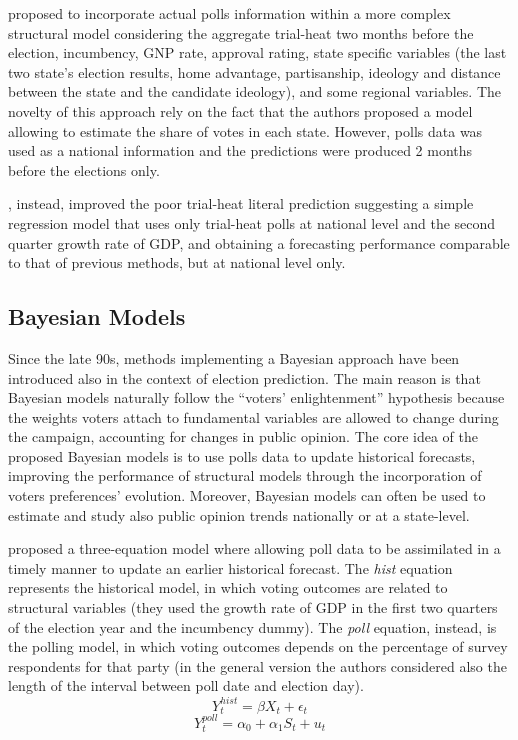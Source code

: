 \documentclass[
  12pt]{article}
\begin{document}
\citet{gel:kin:1993} proposed to incorporate actual polls information
within a more complex structural model considering the aggregate
trial-heat two months before the election, incumbency, GNP rate,
approval rating, state specific variables (the last two state's election
results, home advantage, partisanship, ideology and distance between the
state and the candidate ideology), and some regional variables. The
novelty of this approach rely on the fact that the authors proposed a
model allowing to estimate the share of votes in each state. However,
polls data was used as a national information and the predictions were
produced 2 months before the elections only.

\citet{cam:1996}, instead, improved the poor trial-heat literal
prediction suggesting a simple regression model that uses only
trial-heat polls at national level and the second quarter growth rate of
GDP, and obtaining a forecasting performance comparable to that of
previous methods, but at national level only.

\hypertarget{bayesian-models}{%
\subsection{Bayesian Models}\label{bayesian-models}}

Since the late 90s, methods implementing a Bayesian approach have been
introduced also in the context of election prediction. The main reason
is that Bayesian models naturally follow the ``voters' enlightenment''
hypothesis because the weights voters attach to fundamental variables
are allowed to change during the campaign, accounting for changes in
public opinion. The core idea of the proposed Bayesian models is to use
polls data to update historical forecasts, improving the performance of
structural models through the incorporation of voters preferences'
evolution. Moreover, Bayesian models can often be used to estimate and
study also public opinion trends nationally or at a state-level.

\citet{bro:cha:1999} proposed a three-equation model where allowing poll
data to be assimilated in a timely manner to update an earlier
historical forecast. The \emph{hist} equation represents the historical
model, in which voting outcomes are related to structural variables
(they used the growth rate of GDP in the first two quarters of the
election year and the incumbency dummy). The \emph{poll} equation,
instead, is the polling model, in which voting outcomes depends on the
percentage of survey respondents for that party (in the general version
the authors considered also the length of the interval between poll date
and election day). \[Y_{t}^{hist} = \beta X_t + \epsilon_t\]
\[Y_{t}^{poll} = \alpha_0 + \alpha_1 S_t + u_t\]
\end{document}
